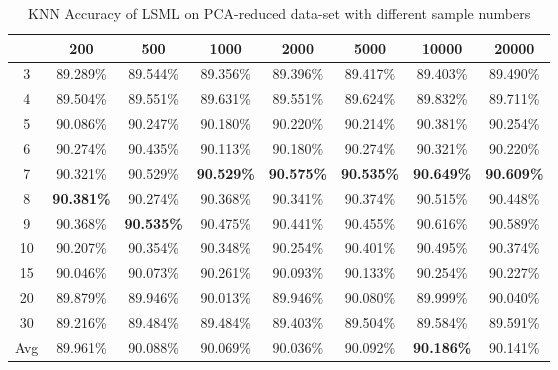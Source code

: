 \begin{table}[h]
\centering
\caption{KNN Accuracy of LSML on PCA-reduced data-set with different sample numbers \label{tab:lsml2}}
\begin{tabular}{cccccccc}
\hline
    & 200      & 500      & 1000     & 2000     & 5000     & 10000    & 20000    \\ \hline
3   & 89.289\% & 89.544\% & 89.356\% & 89.396\% & 89.417\% & 89.403\% & 89.490\% \\
4   & 89.504\% & 89.551\% & 89.631\% & 89.551\% & 89.624\% & 89.832\% & 89.711\% \\
5   & 90.086\% & 90.247\% & 90.180\% & 90.220\% & 90.214\% & 90.381\% & 90.254\% \\
6   & 90.274\% & 90.435\% & 90.113\% & 90.180\% & 90.274\% & 90.321\% & 90.220\% \\
7   & 90.321\% & 90.529\% & \textbf{90.529\%} & \textbf{90.575\%} & \textbf{90.535\%} & \textbf{90.649\%} & \textbf{90.609\%} \\
8   & \textbf{90.381\%} & 90.274\% & 90.368\% & 90.341\% & 90.374\% & 90.515\% & 90.448\% \\
9   & 90.368\% & \textbf{90.535\%} & 90.475\% & 90.441\% & 90.455\% & 90.616\% & 90.589\% \\
10  & 90.207\% & 90.354\% & 90.348\% & 90.254\% & 90.401\% & 90.495\% & 90.374\% \\
15  & 90.046\% & 90.073\% & 90.261\% & 90.093\% & 90.133\% & 90.254\% & 90.227\% \\
20  & 89.879\% & 89.946\% & 90.013\% & 89.946\% & 90.080\% & 89.999\% & 90.040\% \\
30  & 89.216\% & 89.484\% & 89.484\% & 89.403\% & 89.504\% & 89.584\% & 89.591\% \\ \hline
Avg & 89.961\% & 90.088\% & 90.069\% & 90.036\% & 90.092\% & \textbf{90.186\%} & 90.141\% \\ \hline
\end{tabular}
\end{table}


